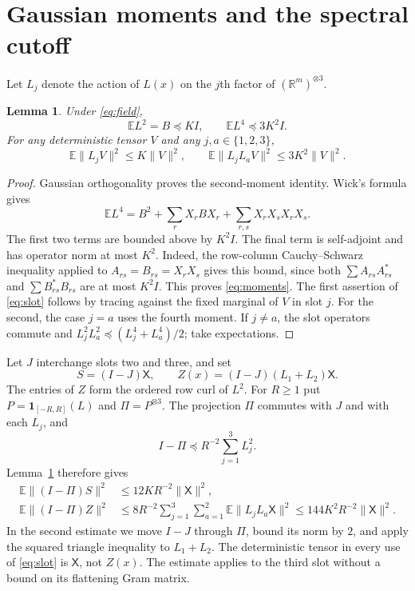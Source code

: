 \documentclass[11pt,reqno]{amsart}
\numberwithin{equation}{section}
\newtheorem{lemma}[theorem]{Lemma}
\theoremstyle{remark}
\newcommand{\E}{\mathbb E}
\newcommand{\R}{\mathbb R}
\newcommand{\X}{\mathsf X}
\begin{document}
\section{Gaussian moments and the spectral cutoff}
Let $L_j$ denote the action of $L(x)$ on the $j$th factor of
$(\R^m)^{\otimes3}$.
\begin{lemma}\label{lem:moments}
Under \eqref{eq:field},
\begin{equation}\label{eq:moments}
 \E L^2=B\preceq KI,\qquad \E L^4\preceq3K^2I.
\end{equation}
For any deterministic tensor $V$ and any $j,a\in\{1,2,3\}$,
\begin{equation}\label{eq:slot}
 \E\|L_jV\|^2\le K\|V\|^2,\qquad
 \E\|L_jL_aV\|^2\le3K^2\|V\|^2.
\end{equation}
\end{lemma}
\begin{proof}
Gaussian orthogonality proves the second-moment identity. Wick's
formula gives
\[
 \E L^4=B^2+\sum_rX_rBX_r+\sum_{r,s}X_rX_sX_rX_s.
\]
The first two terms are bounded above by $K^2I$. The final term is
self-adjoint and has operator norm at most $K^2$. Indeed, the
row-column Cauchy--Schwarz inequality applied to $A_{rs}=B_{rs}=X_rX_s$
gives this bound, since both
$\sum A_{rs}A_{rs}^*$ and $\sum B_{rs}^*B_{rs}$ are at most $K^2I$.
This proves \eqref{eq:moments}. The first assertion of \eqref{eq:slot}
follows by tracing against the fixed marginal of $V$ in slot $j$.
For the second, the case $j=a$ uses the fourth moment. If $j\ne a$,
the slot operators commute and
$L_j^2L_a^2\preceq(L_j^4+L_a^4)/2$; take expectations.
\end{proof}

Let $J$ interchange slots two and three, and set
\[
 S=(I-J)\X,\qquad Z(x)=(I-J)(L_1+L_2)\X.
\]
The entries of $Z$ form the ordered row curl of $L^2$. For $R\ge1$
put $P=\mathbf1_{[-R,R]}(L)$ and $\Pi=P^{\otimes3}$. The projection
$\Pi$ commutes with $J$ and with each $L_j$, and
\[
 I-\Pi\preceq R^{-2}\sum_{j=1}^3L_j^2.
\]
Lemma~\ref{lem:moments} therefore gives
\begin{align}
 \E\|(I-\Pi)S\|^2&\le12KR^{-2}\|\X\|^2,\label{eq:tailS}\\
 \E\|(I-\Pi)Z\|^2
 &\le8R^{-2}\sum_{j=1}^3\sum_{a=1}^2\E\|L_jL_a\X\|^2
 \le144K^2R^{-2}\|\X\|^2.\label{eq:tailZ}
\end{align}
In the second estimate we move $I-J$ through $\Pi$, bound its norm by
$2$, and apply the squared triangle inequality to $L_1+L_2$.
The deterministic tensor in every use of \eqref{eq:slot} is $\X$,
not $Z(x)$. The estimate applies to the third slot without a bound on
its flattening Gram matrix.
\end{document}
